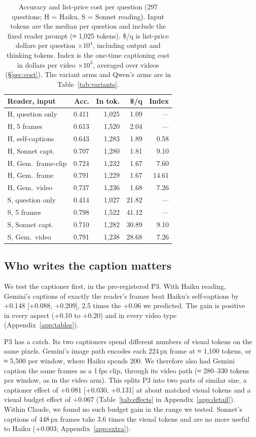 \documentclass[11pt]{article}
\begin{document}
\begin{table}[t]
\centering
\footnotesize
\setlength{\tabcolsep}{2.5pt}
\begin{tabular}{@{}lrrrr@{}}
\toprule
Reader, input & Acc. & In tok. & \$/q & Index \\
\midrule
H, question only & 0.411 & 1,025 & 1.09 & — \\
H, 5 frames & 0.613 & 1,520 & 2.04 & — \\
H, self-captions & 0.643 & 1,283 & 1.89 & 0.58 \\
H, Sonnet capt. & 0.707 & 1,280 & 1.81 & 9.10 \\
H, Gem.\ frame-clip & 0.724 & 1,232 & 1.67 & 7.60 \\
H, Gem.\ frame & 0.791 & 1,229 & 1.67 & 14.61 \\
H, Gem.\ video & 0.737 & 1,236 & 1.68 & 7.26 \\
\midrule
S, question only & 0.414 & 1,027 & 21.82 & — \\
S, 5 frames & 0.798 & 1,522 & 41.12 & — \\
S, Sonnet capt. & 0.710 & 1,282 & 30.89 & 9.10 \\
S, Gem.\ video & 0.791 & 1,238 & 28.68 & 7.26 \\
\bottomrule
\end{tabular}
\caption{Accuracy and list-price cost per question (297 questions; H = Haiku, S = Sonnet reading). Input tokens are the median per question and include the fixed reader prompt (≈ 1,025 tokens). \$/q is list-price dollars per question ×$10^{4}$, including output and thinking tokens. Index is the one-time captioning cost in dollars per video ×$10^{3}$, averaged over videos (\S\ref{sec:cost}). The variant arms and Qwen's arms are in Table~\ref{tab:variants}.}
\label{tab:main}
\end{table}

\subsection{Who writes the caption matters}
\label{sec:captioner}

We test the captioner first, in the pre-registered P3. With Haiku reading, Gemini's captions of exactly the reader's frames beat Haiku's self-captions by +0.148 [+0.088, +0.209], 2.5 times the +0.06 we predicted. The gain is positive in every aspect (+0.10 to +0.20) and in every video type (Appendix~\ref{app:tables}).

P3 has a catch. Its two captioners spend different numbers of visual tokens on the same pixels. Gemini's image path encodes each 224\,px frame at ≈ 1,100 tokens, or ≈ 5,500 per window, where Haiku spends 200. We therefore also had Gemini caption the same frames as a 1\,fps clip, through its video path (≈ 280--330 tokens per window, as in the video arm). This splits P3 into two parts of similar size, a captioner effect of +0.081 [+0.030, +0.131] at about matched visual tokens and a visual budget effect of +0.067 (Table~\ref{tab:effects} in Appendix~\ref{app:detail}). Within Claude, we found no such budget gain in the range we tested. Sonnet's captions of 448\,px frames take 3.6 times the visual tokens and are no more useful to Haiku (+0.003; Appendix~\ref{app:extra}).
\end{document}
